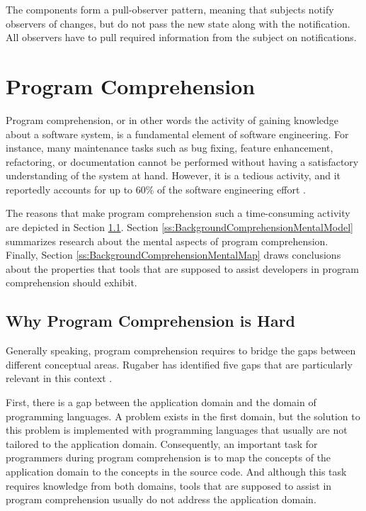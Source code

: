 The components form a pull-observer pattern, meaning that subjects notify observers of changes, but do not pass the new state along with the notification.
All observers have to pull required information from the subject on notifications.

\section{Program Comprehension}
\label{s:BackgroundComprehension}
Program comprehension, or in other words the activity of gaining knowledge about a software system, is a fundamental element of software engineering.
For instance, many maintenance tasks such as bug fixing, feature enhancement, refactoring, or documentation cannot be performed without having a satisfactory understanding of the system at hand.
However, it is a tedious activity, and it reportedly accounts for up to 60\% of the software engineering effort \cite{corbi_program_1989, basili_evolving_1997}.

The reasons that make program comprehension such a time-consuming activity are depicted in Section \ref{ss:BackgroundComprehensionDifficulties}.
Section \ref{ss:BackgroundComprehensionMentalModel} summarizes research about the mental aspects of program comprehension.
Finally, Section \ref{ss:BackgroundComprehensionMentalMap} draws conclusions about the properties that tools that are supposed to assist developers in program comprehension should exhibit. 

\subsection{Why Program Comprehension is Hard}
\label{ss:BackgroundComprehensionDifficulties}
Generally speaking, program comprehension requires to bridge the gaps between different conceptual areas.
Rugaber has identified five gaps that are particularly relevant in this context \cite{kent_program_1996}.

First, there is a gap between the application domain and the domain of programming languages.
A problem exists in the first domain, but the solution to this problem is implemented with programming languages that usually are not tailored to the application domain.
Consequently, an important task for programmers during program comprehension is to map the concepts of the application domain to the concepts in the source code.
And although this task requires knowledge from both domains, tools that are supposed to assist in program comprehension usually do not address the application domain.

